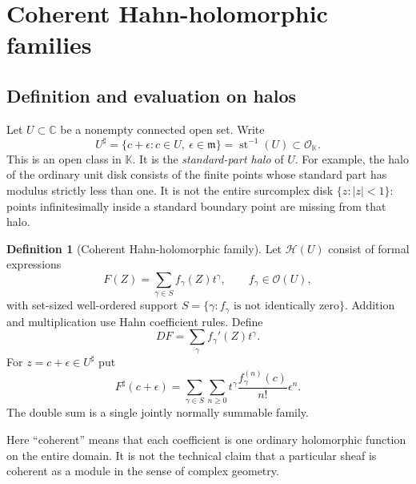 \documentclass[11pt,letterpaper]{article}
\numberwithin{equation}{section}
\theoremstyle{definition}
\newtheorem{definition}[definition]{Definition}
\theoremstyle{remark}
\newcommand{\K}{\mathbb K}
\newcommand{\C}{\mathbb C}
\newcommand{\OO}{\mathcal O}
\newcommand{\HH}{\mathscr H}
\newcommand{\mm}{\mathfrak m}
\DeclareMathOperator{\st}{st}
\begin{document}
\section{Coherent Hahn-holomorphic families}
\label{sec:coherent}

\subsection{Definition and evaluation on halos}

Let $U\subset\C$ be a nonempty connected open set. Write
\[
 U^\sharp=\{c+\epsilon:c\in U,\ \epsilon\in\mm\}
          =\st^{-1}(U)\subset\OO_\K.
\]
This is an open class in $\K$. It is the \emph{standard-part halo} of $U$.
For example, the halo of the ordinary unit disk consists of the finite
points whose standard part has modulus strictly less than one. It is not
the entire surcomplex disk $\{z:|z|<1\}$: points infinitesimally inside
a standard boundary point are missing from that halo.

\begin{definition}[Coherent Hahn-holomorphic family]\label{def:Hahn}
Let $\HH(U)$ consist of formal expressions
\begin{equation}\label{eq:Hahn}
 F(Z)=\sum_{\gamma\in S}f_\gamma(Z)t^\gamma,
 \qquad f_\gamma\in\OO(U),
\end{equation}
with set-sized well-ordered support
$S=\{\gamma:f_\gamma\text{ is not identically zero}\}$.
Addition and multiplication use Hahn coefficient rules. Define
\[
 D F=\sum_\gamma f_\gamma'(Z)t^\gamma.
\]
For $z=c+\epsilon\in U^\sharp$ put
\begin{equation}\label{eq:evaluation}
 F^\sharp(c+\epsilon)=
 \sum_{\gamma\in S}\sum_{n\ge0}
 t^\gamma\frac{f_\gamma^{(n)}(c)}{n!}\epsilon^n.
\end{equation}
The double sum is a single jointly normally summable family.
\end{definition}

Here ``coherent'' means that each coefficient is one ordinary holomorphic
function on the entire domain. It is not the technical claim that a
particular sheaf is coherent as a module in the sense of complex geometry.
\end{document}
